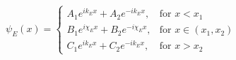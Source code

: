 \[
\psi_E(x)=
\begin{cases}
    A_{1}e^{ik_{E}x} + A_{2}e^{-ik_{E}x}, & \text{for } x < x_1 \\
    B_{1}e^{i\chi_{E}x} + B_{2}e^{-i\chi_{E}x}, & \text{for } x \in (x_1, x_2) \\
    C_{1}e^{ik_{E}x} + C_{2}e^{-ik_{E}x}, & \text{for } x > x_2
\end{cases}
\]
